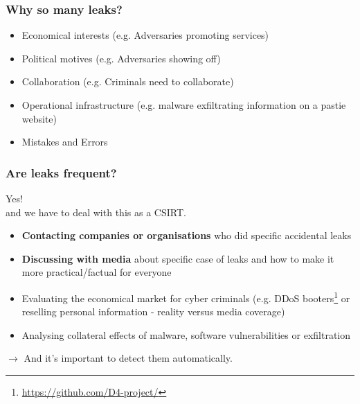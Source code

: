 \documentclass{beamer}
\begin{document}
\begin{frame}
        \frametitle{Why so many leaks?}
        \begin{itemize}
                \item Economical interests (e.g. Adversaries promoting services)
                \item Political motives (e.g. Adversaries showing off)
                \item Collaboration (e.g. Criminals need to collaborate)
                \item Operational infrastructure (e.g. malware exfiltrating information on a pastie website)
                \item Mistakes and Errors
        \end{itemize}
\end{frame}

\begin{frame}
    \frametitle{Are leaks frequent?}
    \begin{center}
    \Large{Yes!}\\ and we have to deal with this as a CSIRT.
    \end{center}

    \begin{itemize}
            \item {\bf Contacting companies or organisations} who did specific accidental leaks
            \item {\bf Discussing with media} about specific case of leaks and how to make it more practical/factual for everyone
            \item Evaluating the economical market for cyber criminals (e.g. DDoS booters\footnote{\url{https://github.com/D4-project/}} or reselling personal information - reality versus media coverage)
            \item Analysing collateral effects of malware, software vulnerabilities or exfiltration
    \end{itemize}

    \begin{center}
    $\rightarrow$ And it's important to detect them automatically.
    \end{center}
\end{frame}
\end{document}
